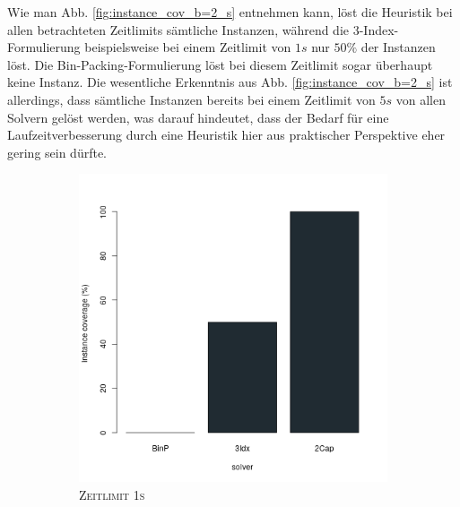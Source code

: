 Wie man Abb. \ref{fig:instance_cov_b=2_s} entnehmen kann, löst die Heuristik bei allen betrachteten Zeitlimits sämtliche Instanzen,
während die 3-Index-Formulierung beispielsweise bei einem Zeitlimit von $1s$ nur $50 \%$ der Instanzen löst.
Die Bin-Packing-Formulierung löst bei diesem Zeitlimit sogar überhaupt keine Instanz.\newline
Die wesentliche Erkenntnis aus Abb. \ref{fig:instance_cov_b=2_s} ist allerdings, dass sämtliche Instanzen bereits bei einem Zeitlimit von $5s$
von allen Solvern gelöst werden, was darauf hindeutet, dass der Bedarf für eine Laufzeitverbesserung durch eine Heuristik hier
aus praktischer Perspektive eher gering sein dürfte.

\begin{figure}[H]
\centering

\begin{subfigure}[b]{0.3\textwidth}
\centering
\includegraphics[width=1.2\textwidth]{img/solver_instance_coverage_b=2_s_1s.png}
\caption{\textsc{Zeitlimit 1s}}
\label{fig:instance_cov_b=2_s_a}
\end{subfigure}
\hfill
\begin{subfigure}[b]{0.3\textwidth}
\centering

\end{subfigure}
\end{figure}
